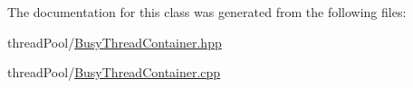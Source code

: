 The documentation for this class was generated from the following files\+:\begin{DoxyCompactItemize}
\item 
thread\+Pool/\hyperlink{BusyThreadContainer_8hpp}{Busy\+Thread\+Container.\+hpp}\item 
thread\+Pool/\hyperlink{BusyThreadContainer_8cpp}{Busy\+Thread\+Container.\+cpp}\end{DoxyCompactItemize}
